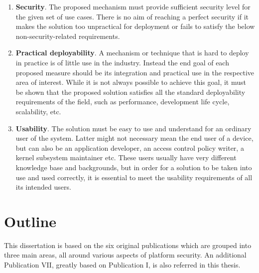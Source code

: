 \begin{enumerate}
	\item \textbf{Security}. The proposed mechanism must provide sufficient security level for the given set of use cases. There is no aim of reaching a perfect security if it makes the solution too unpractical for deployment or fails to satisfy the below non-security-related requirements.      
	\item \textbf{Practical deployability}. A mechanism or technique that is hard to deploy in practice is of little use in the industry. Instead the end goal of each proposed measure should be its integration and practical use in the respective area of interest. While it is not always possible to achieve this goal, it must be shown that the proposed solution satisfies all the standard deployability requirements of the field, such as performance, development life cycle, scalability, etc.  
	\item \textbf{Usability}.	The solution must be easy to use and understand for an ordinary user of the system. Latter might not necessary mean the end user of a device, but can also be an application developer, an access control policy writer, a kernel subsystem maintainer etc. These users usually have very different knowledge base and backgrounds, but in order for a solution to be taken into use and used correctly, it is essential to meet the usability requirements of all its intended users. 
\end{enumerate}

\section{Outline}

This dissertation is based on the six original publications which are grouped into three main areas, all around various aspects of platform security. An additional Publication VII, greatly based on Publication I, is also referred in this thesis. 

